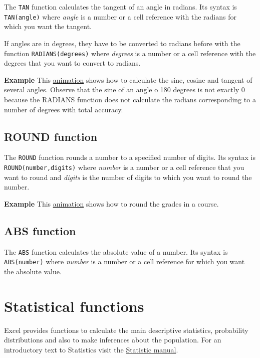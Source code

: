 The \texttt{TAN} function calculates the tangent of an angle in radians. Its syntax is \texttt{TAN(angle)} where \emph{angle} is a number or a cell reference with the radians for which you want the tangent.

If angles are in degrees, they have to be converted to radians before with the function \texttt{RADIANS(degrees)} where \emph{degrees} is a number or a cell reference with the degrees that you want to convert to radians.

\textbf{Example} This \href{http://aprendeconalf.es/office/excel/manual/img/example_function_sin_cos_tan.gif}{animation} shows how to calculate the sine, cosine and tangent of several angles. Observe that the sine of an angle o 180 degrees is not exactly 0 because the RADIANS function does not calculate the radians corresponding to a number of degrees with total accuracy.

\subsection{ROUND function}\hypertarget{round-function}{}\label{round-function}

The \texttt{ROUND} function rounds a number to a specified number of digits. Its syntax is \texttt{ROUND(number,digits)} where \emph{number} is a number or a cell reference that you want to round and \emph{digits} is the number of digits to which you want to round the number.

\textbf{Example} This \href{http://aprendeconalf.es/office/excel/manual/img/example_function_round.gif}{animation} shows how to round the grades in a course.

\subsection{ABS function}\hypertarget{abs-function}{}\label{abs-function}

The \texttt{ABS} function calculates the absolute value of a number. Its syntax is \texttt{ABS(number)} where \emph{number} is a number or a cell reference for which you want the absolute value.

\section{Statistical functions}\hypertarget{statistical-functions}{}\label{statistical-functions}

Excel provides functions to calculate the main descriptive statistics, probability distributions and also to make inferences about the population. 
For an introductory text to Statistics visit the \href{/estadistica/manual/}{Statistic manual}.

